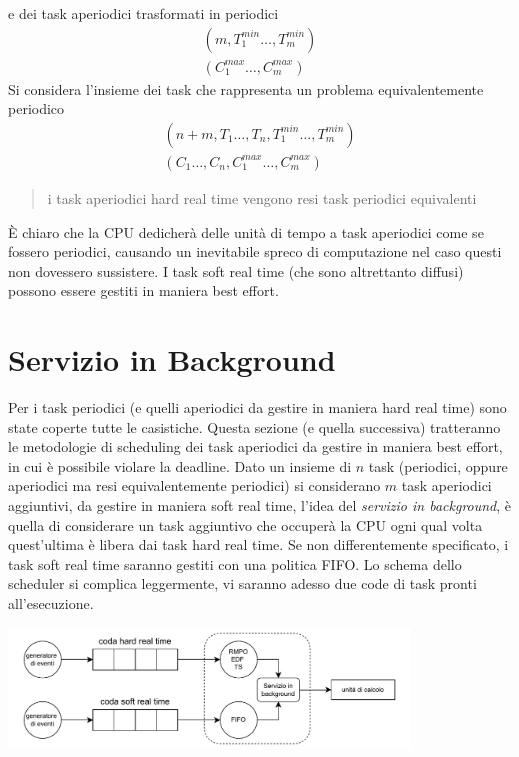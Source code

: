 \documentclass[10pt, letterpaper]{report}
\begin{document}
e dei task aperiodici trasformati in periodici
$$ \begin{matrix}(m,T_1^{min}\dots ,T_m^{min})\\
    (C_1^{max}\dots ,C_m^{max})
\end{matrix}$$
Si considera l'insieme dei task che rappresenta un problema equivalentemente periodico
$$ \begin{matrix}(n+m,T_1\dots ,T_n,T_1^{min}\dots ,T_m^{min})\\
    (C_1\dots ,C_n,C_1^{max}\dots ,C_m^{max})
\end{matrix}$$
\begin{quote}
    i task aperiodici hard real time vengono resi task periodici equivalenti
\end{quote}
È chiaro che la CPU dedicherà delle unità di tempo a task aperiodici come se fossero periodici, causando 
un inevitabile spreco di computazione nel caso questi non dovessero sussistere.\acc 
I task soft real time (che sono altrettanto diffusi) possono essere gestiti in maniera 
best effort.  \flowerLine 
\section{Servizio in Background}
Per i task periodici (e quelli aperiodici da gestire in maniera hard real time) sono state coperte tutte le casistiche. Questa sezione (e quella successiva) tratteranno le metodologie di scheduling dei task aperiodici da gestire in maniera best effort, in cui è possibile violare la deadline.\acc 
Dato un insieme di $n$ task (periodici, oppure aperiodici ma resi equivalentemente periodici) si considerano $m$ task aperiodici aggiuntivi, da gestire in maniera soft real time, l'idea del \textit{servizio in background}, è quella di considerare un task aggiuntivo che occuperà la CPU ogni qual volta quest'ultima è libera dai task hard real time. Se non differentemente specificato, i task soft real time saranno gestiti con una politica FIFO. Lo schema dello scheduler si complica leggermente, vi saranno adesso due code di task pronti all'esecuzione.
\begin{center}
    \includegraphics[width=0.8\textwidth ]{images/schedulerSRT.pdf}
\end{center}
\end{document}
